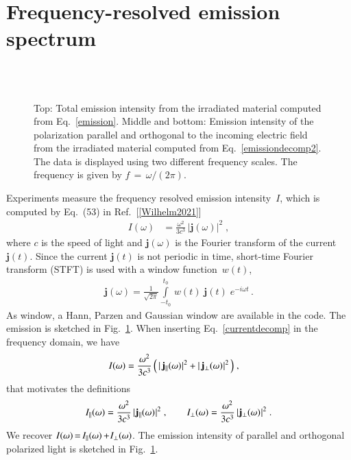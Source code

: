 \documentclass[11pt, a4paper]{scrartcl}
\newlength\figureheight
\newlength\figurewidth
\newcommand{\bj}{\mathbf{j}}
\newcommand{\sd}{\hspace{0.05em}}
\newcommand{\eqt}{\,{=}\,}
\begin{document}
\section{Frequency-resolved emission spectrum}
\begin{figure}
\centering
\setlength\figureheight{7.0cm} 
\setlength{}

\\[1.0em]

\\[1.0em]
%

\caption{Top: Total emission intensity from the irradiated material computed from Eq.~\eqref{emission}. 
%
Middle and bottom: Emission intensity of the polarization parallel and orthogonal to the incoming electric field from the irradiated material computed from Eq.~\eqref{emissiondecomp2}.
%
The data is displayed using two different frequency scales. 
%
The frequency is given by $f\eqt\omega/(2\pi)$.
}
    \label{fig:emission}
\end{figure}

Experiments measure the  frequency resolved emission intensity~$I$, which is computed by Eq.~(53) in Ref.~[\ref{Wilhelm2021}]
\begin{align}
I(\omega) &=
\frac{\omega^2}{3c^3}\,|\bj(\omega)|^2\;, \label{emission}
\end{align}
where $c$ is the speed of light and $\bj(\omega)$ is the Fourier transform of the current $\bj(t)$.
%
Since the current $\bj(t)$ is not periodic in time, short-time Fourier transform (STFT) is used with a window function~$w(t)$,
\begin{align}
    \bj(\omega) = \frac{1}{\sqrt{2\pi}}\int\limits_{-t_0}^{t_0}\,w(t)\;\bj(t)\;e^{-i\omega t}\,.
\end{align}
%
As window, a Hann, Parzen and Gaussian window are available in the code. 
%
The emission is sketched in Fig.~\ref{fig:emission}.
%
%
When inserting Eq.~\eqref{currentdecomp} in the frequency domain, we have
\begin{align}
I(\omega) &=
\frac{\omega^2}{3c^3}\,\Big(\,|\,\bj_\parallel(\omega)\sd|^2
+ |\,\bj_\bot(\omega)\sd|^2 \,\Big)
\;, \label{emissiondecomp}
\end{align}
that motivates the definitions
\begin{align}
I_\parallel(\omega) =
\frac{\omega^2}{3c^3}\, |\sd\bj_\parallel(\omega)\sd|^2\;,
\hspace{2em}
I_\bot(\omega) =
\frac{\omega^2}{3c^3}\, |\sd\bj_\bot(\omega)\sd|^2\;. \label{emissiondecomp2}
\end{align}
We recover $I(\omega)\eqt I_\parallel(\omega)\,{+}\sd I_\bot(\omega)$.
%
The emission intensity of parallel and orthogonal polarized light is sketched in Fig.~\ref{fig:emission}.
\end{document}
